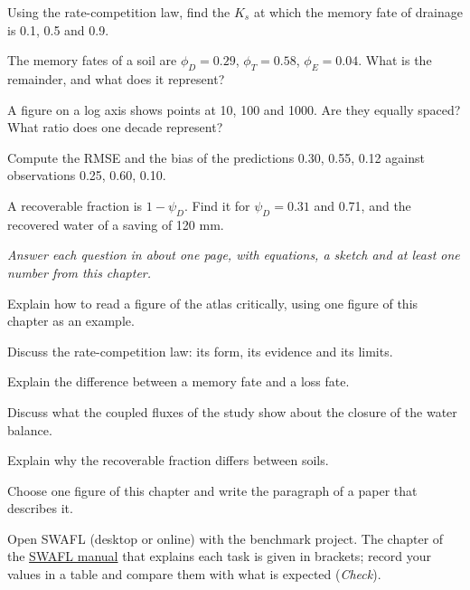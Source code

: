 \begin{exlist}
\item Using the rate-competition law, find the $K_s$ at which the memory fate of drainage is 0.1, 0.5 and 0.9.
\item The memory fates of a soil are $\phi_D=0.29$, $\phi_T=0.58$, $\phi_E=0.04$. What is the remainder, and what does it represent?
\item A figure on a log axis shows points at 10, 100 and 1000. Are they equally spaced? What ratio does one decade represent?
\item Compute the RMSE and the bias of the predictions 0.30, 0.55, 0.12 against observations 0.25, 0.60, 0.10.
\item A recoverable fraction is $1-\psi_D$. Find it for $\psi_D=0.31$ and 0.71, and the recovered water of a saving of 120 mm.
\end{exlist}
{\small\itshape Answer each question in about one page, with equations, a sketch and at least one number from this chapter.}\par\vspace{3pt}
\begin{exlist}
\item Explain how to read a figure of the atlas critically, using one figure of this chapter as an example.
\item Discuss the rate-competition law: its form, its evidence and its limits.
\item Explain the difference between a memory fate and a loss fate.
\item Discuss what the coupled fluxes of the study show about the closure of the water balance.
\item Explain why the recoverable fraction differs between soils.
\item Choose one figure of this chapter and write the paragraph of a paper that describes it.
\end{exlist}
{\small Open SWAFL (desktop or online) with the benchmark project. The chapter of the \href{https://github.com/halilunaziru73-creator/Coupled-Water-Fluxes-Pore-Scale-Dynamics-Precision-Irrigation-Mulching-Feedback-Loops/raw/main/Software/v1.1.0/SWAFL_Desktop/docs/manual_v1.1.0/SWAFL_Manual_v1.1.0.pdf}{SWAFL manual} that explains each task is given in brackets; record your values in a table and compare them with what is expected (\emph{Check}).}\par\vspace{3pt}
